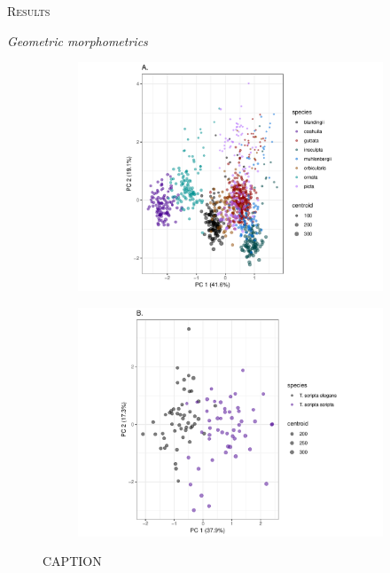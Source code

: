 \documentclass[12pt,letterpaper]{article}
\renewcommand{\section}[1]{%
\bigskip
\begin{center}
\begin{Large}
\normalfont\scshape #1
\medskip
\end{Large}
\end{center}}
\renewcommand{\subsection}[1]{%
\bigskip
\begin{center}
\begin{large}
\normalfont\itshape #1
\end{large}
\end{center}}
\begin{document}
\section{Results}

\subsection{Geometric morphometrics}

\begin{figure}[ht]
  \centering
  \begin{subfigure}[b]{0.4\textwidth}
    \caption{}
    \includegraphics[width = \textwidth]{figure/cc7_pc_graph}
  \end{subfigure}
  \begin{subfigure}[b]{0.4\textwidth}
    \caption{}
    \includegraphics[width = \textwidth]{figure/tra_pc_graph}
  \end{subfigure}
  \caption{CAPTION}
  \label{fig:other_pca}
\end{figure}
\end{document}
